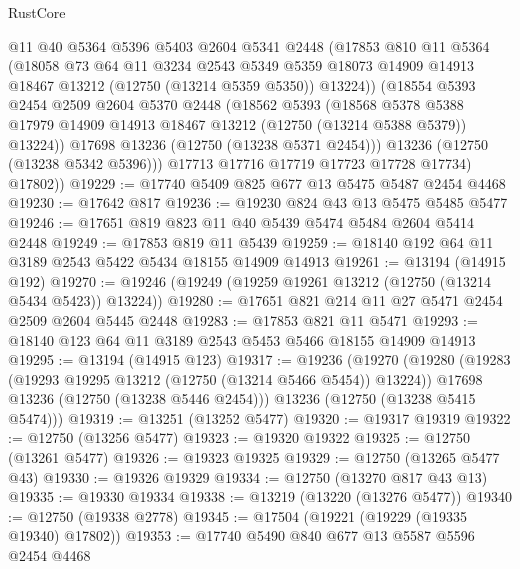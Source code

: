 \begin{lexlean}{RustCore}
\begin{coremodule}
            @11
            @40
            @5364
            @5396
            @5403
            @2604
            @5341
            @2448
            (@17853
              @810
              @11
              @5364
              (@18058
                @73
                @64
                @11
                @3234
                @2543
                @5349
                @5359
                @18073
                @14909
                @14913
                @18467
                @13212
                (@12750 (@13214 @5359 @5350))
                @13224))
            (@18554
              @5393
              @2454
              @2509
              @2604
              @5370
              @2448
              (@18562
                @5393
                (@18568
                  @5378
                  @5388
                  @17979
                  @14909
                  @14913
                  @18467
                  @13212
                  (@12750 (@13214 @5388 @5379))
                  @13224))
              @17698
              @13236
              (@12750 (@13238 @5371 @2454)))
            @13236
            (@12750 (@13238 @5342 @5396)))
          @17713
          @17716
          @17719
          @17723
          @17728
          @17734)
        @17802))
@19229 := @17740 @5409 @825 @677 @13 @5475 @5487 @2454 @4468
@19230 := @17642 @817
@19236 := @19230 @824 @43 @13 @5475 @5485 @5477
@19246 := @17651 @819 @823 @11 @40 @5439 @5474 @5484 @2604 @5414 @2448
@19249 := @17853 @819 @11 @5439
@19259 := @18140 @192 @64 @11 @3189 @2543 @5422 @5434 @18155 @14909 @14913
@19261 := @13194 (@14915 @192)
@19270 := @19246 (@19249 (@19259 @19261 @13212 (@12750 (@13214 @5434 @5423)) @13224))
@19280 := @17651 @821 @214 @11 @27 @5471 @2454 @2509 @2604 @5445 @2448
@19283 := @17853 @821 @11 @5471
@19293 := @18140 @123 @64 @11 @3189 @2543 @5453 @5466 @18155 @14909 @14913
@19295 := @13194 (@14915 @123)
@19317 := @19236
    (@19270
      (@19280
        (@19283 (@19293 @19295 @13212 (@12750 (@13214 @5466 @5454)) @13224))
        @17698
        @13236
        (@12750 (@13238 @5446 @2454)))
      @13236
      (@12750 (@13238 @5415 @5474)))
@19319 := @13251 (@13252 @5477)
@19320 := @19317 @19319
@19322 := @12750 (@13256 @5477)
@19323 := @19320 @19322
@19325 := @12750 (@13261 @5477)
@19326 := @19323 @19325
@19329 := @12750 (@13265 @5477 @43)
@19330 := @19326 @19329
@19334 := @12750 (@13270 @817 @43 @13)
@19335 := @19330 @19334
@19338 := @13219 (@13220 (@13276 @5477))
@19340 := @12750 (@19338 @2778)
@19345 := @17504 (@19221 (@19229 (@19335 @19340) @17802))
@19353 := @17740 @5490 @840 @677 @13 @5587 @5596 @2454 @4468

\end{coremodule}
\end{lexlean}
